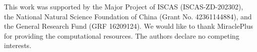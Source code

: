 \begin{ack}
This work was supported by the Major Project of ISCAS (ISCAS-ZD-202302), the National Natural Science Foundation of China (Grant No. 42361144884), and the General Research Fund (GRF 16209124). We would like to thank MiraclePlus for providing the computational resources. The authors declare no competing interests. 
\end{ack}